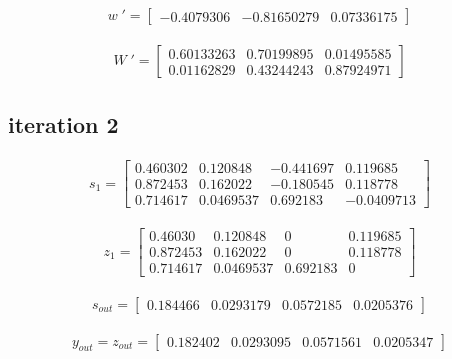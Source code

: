 \documentclass[a4paper]{article}
\begin{document}
\begin{gather} w\;' = \begin{bmatrix} -0.4079306 & -0.81650279 & 0.07336175 \end{bmatrix}\nonumber \end{gather}

\begin{gather}
W\;' =
 \begin{bmatrix} 0.60133263 & 0.70199895 & 0.01495585 \\ 0.01162829 & 0.43244243 & 0.87924971 \end{bmatrix}
 \nonumber 
\end{gather}

\subsection{iteration 2}

\begin{gather}s_1 = \begin{bmatrix} 0.460302 & 0.120848 & -0.441697 & 0.119685 \\ 0.872453 & 	0.162022 & 	-0.180545 & 0.118778 \\ 0.714617 & 0.0469537 &	0.692183 &	-0.0409713 \end{bmatrix}\nonumber \end{gather} 

\begin{gather}z_1 = \begin{bmatrix} 0.46030 & 0.120848 & 0 & 0.119685 \\ 0.872453 &	0.162022 & 0 & 0.118778 \\ 0.714617 & 0.0469537 & 0.692183 & 0 \end{bmatrix}\nonumber \end{gather}

\begin{gather}s_{out} = \begin{bmatrix} 0.184466 &	0.0293179 &	0.0572185 &	0.0205376
 \end{bmatrix}\nonumber \end{gather}

\begin{gather}y_{out} = z_{out} = \begin{bmatrix} 0.182402 &	0.0293095 &	0.0571561 &	0.0205347
\end{bmatrix}\nonumber \end{gather}
\end{document}
